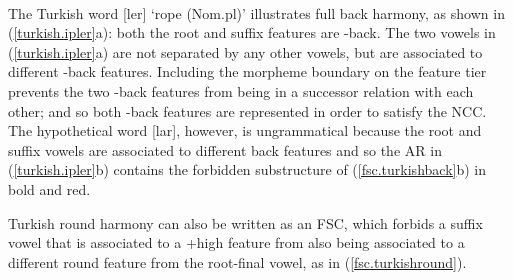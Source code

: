 \documentclass[,doc,floatsintext]{apa6}
\theoremstyle{definition}
\theoremstyle{definition}
\theoremstyle{definition}
\theoremstyle{remark}
\begin{document}
\begin{exe}
\label{turkish.ipler} \\
\end{exe}

\noindent The Turkish word {[}ler{]} `rope (Nom.pl)'
illustrates full back harmony, as shown in (\ref{turkish.ipler}a): both
the root and suffix features are -back. The two vowels in
(\ref{turkish.ipler}a) are not separated by any other vowels, but are
associated to different -back features. Including the morpheme boundary
on the feature tier prevents the two -back features from being in a
successor relation with each other; and so both -back features are
represented in order to satisfy the NCC. The hypothetical word
{[}lar{]}, however, is ungrammatical because the root
and suffix vowels are associated to different back features and so the
AR in (\ref{turkish.ipler}b) contains the forbidden substructure of
(\ref{fsc.turkishback}b) in bold and red.

Turkish round harmony can also be written as an FSC, which forbids a
suffix vowel that is associated to a +high feature from also being
associated to a different round feature from the root-final vowel, as in
(\ref{fsc.turkishround}).
\end{document}
